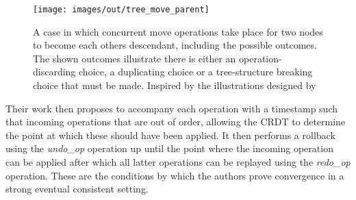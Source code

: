 \begin{figure}
    \centering
    \texttt{[image: images/out/tree\_move\_parent]}
    \caption{
        A case in which concurrent move operations take place for two nodes to become each others descendant, including
        the possible outcomes.
        The shown outcomes illustrate there is either an operation-discarding choice, a duplicating choice or a
        tree-structure breaking choice that must be made.
        Inspired by the illustrations designed by~\citet{9563274}
    }
    \label{fig:tree-move-parent}
\end{figure}

Their work then proposes to accompany each operation with a timestamp such that incoming operations that are out of
order, allowing the CRDT to determine the point at which these should have been applied.
It then performs a rollback using the \emph{undo\_op} operation up until the point where the incoming operation can be
applied after which all latter operations can be replayed using the \emph{redo\_op} operation.
These are the conditions by which the authors prove convergence in a strong eventual consistent setting.
